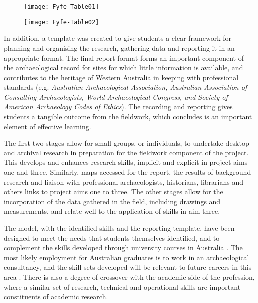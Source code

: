 	\begin{figure}[!htb] %
		\texttt{[image: Fyfe-Table01]}
		\centering
		\label{fig:Fyfe-Table01}
	\end{figure}	
	
	\begin{figure}[!htb] %
		\texttt{[image: Fyfe-Table02]}
		\centering
		\label{fig:Fyfe-Table02}
	\end{figure}
In addition, a template was created to give students a clear framework for planning and organising the research, gathering data and reporting it in an appropriate format. 
	The final report format forms an important component of the archaeological record for sites for which little information is available, and contributes to the heritage of Western Australia in keeping with professional standards (e.g. \emph{Australian Archaeological Association, Australian Association of Consulting Archaeologists, World Archaeological Congress, and Society of American Archaeology Codes of Ethics}). 
	The recording and reporting gives students a tangible outcome from the fieldwork, which \textcite[113-116]{mytum2012c} concludes is an important element of effective learning.
	
	The first two stages allow for small groups, or individuals, to undertake desktop and archival research in preparation for the fieldwork component of the project. 
	This develops and enhances research skills, implicit and explicit in project aims one and three. Similarly, maps accessed for the report, the results of background research and liaison with professional archaeologists, historians, librarians and others links to project aims one to three. 
	The other stages allow for the incorporation of the data gathered in the field, including drawings and measurements, and relate well to the application of skills in aim three.
	
	The model, with the identified skills and the reporting template, have been designed to meet the needs that students themselves identified, and to complement the skills developed through university courses in Australia \parencite[3]{beck2008}. 
	The most likely employment for Australian graduates is to work in an archaeological consultancy, and the skill sets developed will be relevant to future careers in this area \parencites[e.g.][]{ireland2013}{ulm2005}{ulm2013}. 
	There is also a degree of crossover with the academic side of the profession, where a similar set of research, technical and operational skills are important constituents of academic research.
	
